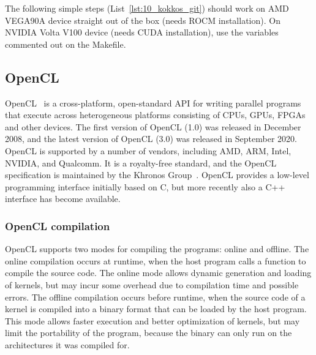 \par
The following simple steps (List~\ref{lst:10_kokkos_git}) should work on AMD VEGA90A device straight out of the box (needs ROCM installation).
On NVIDIA Volta V100 device (needs CUDA installation), use the variables commented out on the Makefile.







\subsection{OpenCL}


\par
OpenCL~\cite{OpenCL} is a cross-platform, open-standard API for writing parallel programs that execute across heterogeneous platforms consisting of CPUs, GPUs, FPGAs and other devices.
The first version of OpenCL (1.0) was released in December 2008, and the latest version of OpenCL (3.0) was released in September 2020.
OpenCL is supported by a number of vendors, including AMD, ARM, Intel, NVIDIA, and Qualcomm.
It is a royalty-free standard, and the OpenCL specification is maintained by the Khronos Group~\cite{khronos_group}.
OpenCL provides a low-level programming interface initially based on C, but more recently also a C++ interface has become available.


\subsubsection{OpenCL compilation}


\par
OpenCL supports two modes for compiling the programs: online and offline.
The online compilation occurs at runtime, when the host program calls a function to compile the source code.
The online mode allows dynamic generation and loading of kernels, but may incur some overhead due to compilation time and possible errors.
The offline compilation occurs before runtime, when the source code of a kernel is compiled into a binary format that can be loaded by the host program.
This mode allows faster execution and better optimization of kernels, but may limit the portability of the program, because the binary can only run on the architectures it was compiled for.


